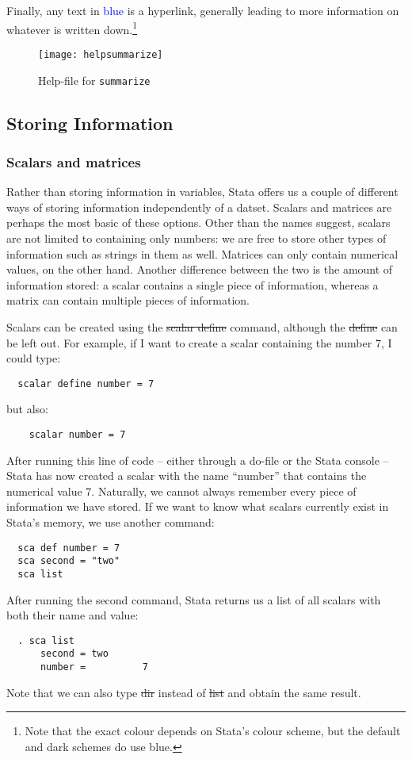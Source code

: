 Finally, any text in \textcolor{blue}{blue} is a hyperlink,
generally leading to more information on whatever is written down.\footnote{Note that the exact colour depends on Stata's colour scheme, but the default and dark schemes do use blue.}

\begin{figure}[tbp]\centering
  \caption{Help-file for \texttt{summarize}}\label{fig:hlpsum}
  \vspace{1ex}
  \texttt{[image: helpsummarize]}
\end{figure}

\subsection{Storing Information}

\subsubsection{Scalars and matrices}

Rather than storing information in variables,
Stata offers us a couple of different ways of storing information independently of a datset.
Scalars and matrices are perhaps the most basic of these options.
Other than the names suggest, scalars are not limited to containing only numbers:
we are free to store other types of information such as strings in them as well.
Matrices can only contain numerical values, on the other hand.
Another difference between the two is the amount of information stored:
a scalar contains a single piece of information,
whereas a matrix can contain multiple pieces of information.

Scalars can be created using the \st{scalar define} command,
although the \st{define} can be left out.
For example,
if I want to create a scalar containing the number 7,
I could type:
\begin{verbatim}
  scalar define number = 7
\end{verbatim}
but also:
\begin{verbatim}
    scalar number = 7
\end{verbatim}

After running this line of code -- either through a do-file or the Stata console -- Stata has now created a scalar with the name ``number'' that contains the numerical value 7.
Naturally, we cannot always remember every piece of information we have stored.
If we want to know what scalars currently exist in Stata's memory, we use another command:
\begin{verbatim}
  sca def number = 7
  sca second = "two"
  sca list
\end{verbatim}
After running the second command, Stata returns us a list of all scalars with both their name and value:
\small\begin{verbatim}
  . sca list
      second = two
      number =          7
\end{verbatim}\normalsize
Note that we can also type \st{dir} instead of \st{list} and obtain the same result.

